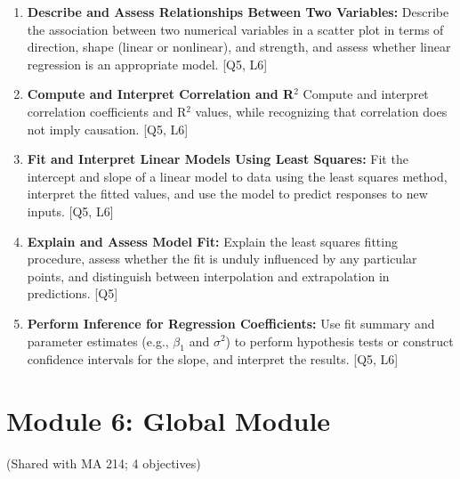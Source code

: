 \documentclass[12pt]{article}
\begin{document}
\begin{enumerate}
    \item \textbf{Describe and Assess Relationships Between Two Variables:} Describe the association between two numerical variables in a scatter plot in terms of direction, shape (linear or nonlinear), and strength, and assess whether linear regression is an appropriate model. [Q5, L6] 
    \item \textbf{Compute and Interpret Correlation and R$^2$} Compute and interpret correlation coefficients and R$^2$ values, while recognizing that correlation does not imply causation. [Q5, L6]
    \item \textbf{Fit and Interpret Linear Models Using Least Squares:} Fit the intercept and slope of a linear model to data using the least squares method, interpret the fitted values, and use the model to predict responses to new inputs. [Q5, L6]
    \item \textbf{Explain and Assess Model Fit:} Explain the least squares fitting procedure, assess whether the fit is unduly influenced by any particular points, and distinguish between interpolation and extrapolation in predictions. [Q5]
    \item \textbf{Perform Inference for Regression Coefficients:} Use fit summary and parameter estimates (e.g., $\beta_1$ and $\sigma^2$) to perform hypothesis tests or construct confidence intervals for the slope, and interpret the results. [Q5, L6] 
\end{enumerate}

\newpage


\section{Module 6: Global Module}
(Shared with MA 214; 4 objectives)

\end{document}
